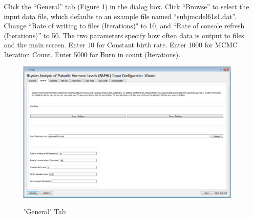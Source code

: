\documentclass[11pt]{book}
\begin{document}
\newpage
Click the ``General'' tab (Figure \ref{general}) in the dialog box.  Click ``Browse'' to select the input data file, which defaults to an example file named ``subjmodel61s1.dat''.  Change ``Rate of writing to files (Iterations)" to 10, and ``Rate of console refresh (Iterations)'' to 50.  The two parameters specify how often data is output to files and the main screen.  Enter 10 for Constant birth rate.  Enter 1000 for MCMC Iteration Count. Enter 5000 for Burn in count (Iterations).\\
\begin{figure}
  \centering
  \includegraphics[width=\textwidth]{generaltab.PNG}\\
  \caption{"General" Tab}\label{general}
\end{figure}
\end{document}
